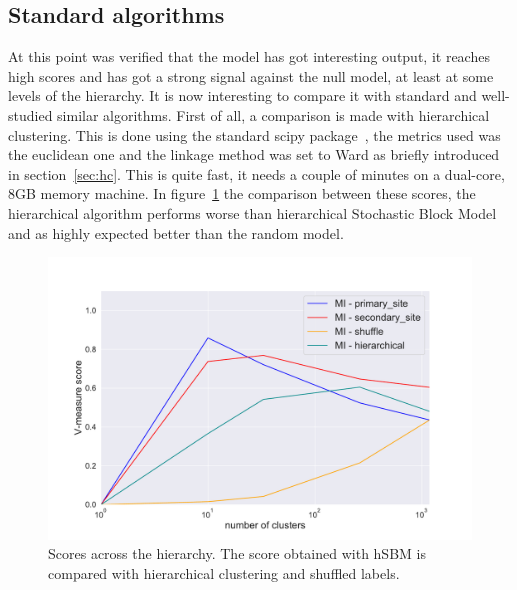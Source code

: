 \subsection{Standard algorithms}
At this point was verified that the model has got interesting output, it reaches high scores and has got a strong signal against the null model, at least at some levels of the hierarchy. It is now interesting to compare it with standard and well-studied similar algorithms.
First of all, a comparison is made with hierarchical clustering. This is done using the standard scipy package~\cite{jones2014scipy}, the metrics used was the euclidean one and the linkage method was set to Ward as briefly introduced in section~\ref{sec:hc}. This is quite fast, it needs a couple of minutes on a dual-core, 8GB memory machine.
In figure~\ref{fig:topic/gtex/oversigma_10tissue/metric_scores_hier} the comparison between these scores, the hierarchical algorithm performs worse than hierarchical Stochastic Block Model and as highly expected better than the random model.
\begin{figure}[htb!]
    \centering
    \includegraphics[width=0.9\linewidth]{pictures/topic/gtex/oversigma_10tissue/metric_scores_hier.pdf}
    \caption{Scores across the hierarchy. The score obtained with hSBM is compared with hierarchical clustering and shuffled labels.}
    \label{fig:topic/gtex/oversigma_10tissue/metric_scores_hier}
\end{figure}

